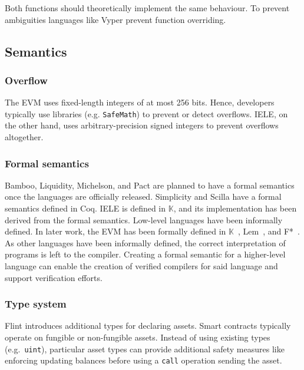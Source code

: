 Both functions should theoretically implement the same behaviour. To prevent ambiguities languages like Vyper prevent function overriding.


\subsection{Semantics}
\subsubsection{Overflow}
The EVM uses fixed-length integers of at most 256 bits.
Hence, developers typically use libraries (e.g. \texttt{SafeMath}) to prevent or detect overflows.
IELE, on the other hand, uses arbitrary-precision signed integers to prevent overflows altogether.

\subsubsection{Formal semantics}
Bamboo, Liquidity, Michelson, and Pact are planned to have a formal semantics once the languages are officially released.  Simplicity and Scilla have a formal semantics defined in Coq. IELE is defined in $\mathbb{K}$, and its implementation has been derived from the formal semantics.
Low-level languages have been informally defined. In later work, the EVM has been formally defined in $\mathbb{K}$~\cite{Hildenbrandt2017}, Lem~\cite{Hirai2017}, and F*~\cite{Grishchenko2018}.
As other languages have been informally defined, the correct interpretation of programs is left to the compiler. Creating a formal semantic for a higher-level language can enable the creation of verified compilers for said language and support verification efforts.

\subsubsection{Type system}
Flint introduces additional types for declaring assets. Smart contracts typically operate on fungible or non-fungible assets. Instead of using existing types (e.g.\ \texttt{uint}), particular asset types can provide additional safety measures like enforcing updating balances before using a \texttt{call} operation sending the asset.


